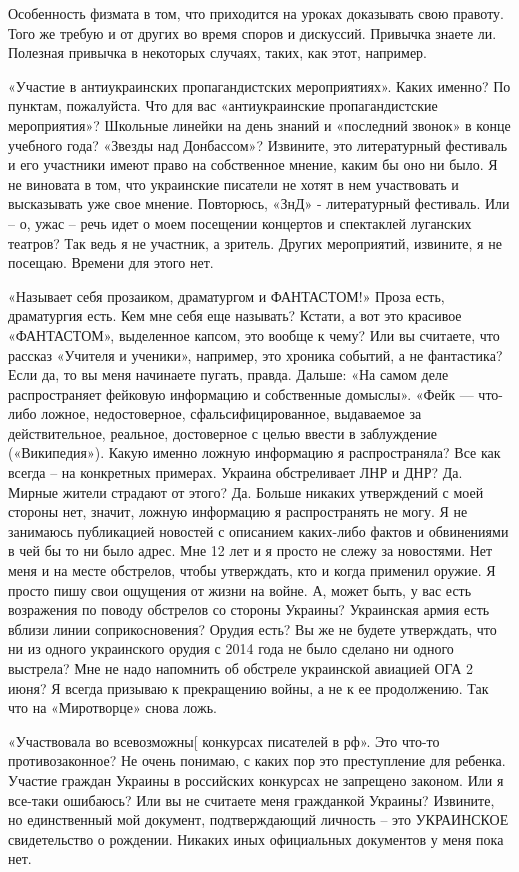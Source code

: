 Особенность физмата в том, что приходится на уроках доказывать свою правоту.
Того же требую и от других во время споров и дискуссий. Привычка знаете ли.
Полезная привычка в некоторых случаях, таких, как этот, например.

«Участие в антиукраинских пропагандистских мероприятиях». Каких именно? По
пунктам, пожалуйста. Что для вас «антиукраинские пропагандистские мероприятия»?
Школьные линейки на день знаний и «последний звонок» в конце учебного года?
«Звезды над Донбассом»? Извините, это литературный фестиваль и его участники
имеют право на собственное мнение, каким бы оно ни было. Я не виновата в том,
что украинские писатели не хотят в нем участвовать и высказывать уже свое
мнение. Повторюсь, «ЗнД» - литературный фестиваль. Или – о, ужас – речь идет о
моем посещении концертов и спектаклей луганских театров? Так ведь я не
участник, а зритель. Других мероприятий, извините, я не посещаю. Времени для
этого нет.

«Называет себя прозаиком, драматургом и ФАНТАСТОМ!» Проза есть, драматургия
есть. Кем мне себя еще называть? Кстати, а вот это красивое «ФАНТАСТОМ»,
выделенное капсом, это вообще к чему? Или вы считаете, что рассказ «Учителя и
ученики», например, это хроника событий, а не фантастика? Если да, то вы меня
начинаете пугать, правда. Дальше: «На самом деле распространяет фейковую
информацию и собственные домыслы». «Фейк — что-либо ложное, недостоверное,
сфальсифицированное, выдаваемое за действительное, реальное, достоверное с
целью ввести в заблуждение («Википедия»). Какую именно ложную информацию я
распространяла? Все как всегда – на конкретных примерах. Украина обстреливает
ЛНР и ДНР? Да. Мирные жители страдают от этого? Да. Больше никаких утверждений
с моей стороны нет, значит, ложную информацию я распространять не могу. Я не
занимаюсь публикацией новостей с описанием каких-либо фактов и обвинениями в
чей бы то ни было адрес. Мне 12 лет и я просто не слежу за новостями. Нет меня
и на месте обстрелов, чтобы утверждать, кто и когда применил оружие. Я просто
пишу свои ощущения от жизни на войне. А, может быть, у вас есть возражения по
поводу обстрелов со стороны Украины? Украинская армия есть вблизи линии
соприкосновения? Орудия есть? Вы же не будете утверждать, что ни из одного
украинского орудия с 2014 года не было сделано ни одного выстрела? Мне не надо
напомнить об обстреле украинской авиацией ОГА 2 июня? Я всегда призываю к
прекращению войны, а не к ее продолжению. Так что на «Миротворце» снова ложь.

«Участвовала во всевозможны[ конкурсах писателей в рф». Это что-то
противозаконное? Не очень понимаю, с каких пор это преступление для ребенка.
Участие граждан Украины в российских конкурсах не запрещено законом. Или я
все-таки ошибаюсь? Или вы не считаете меня гражданкой Украины? Извините, но
единственный мой документ, подтверждающий личность – это УКРАИНСКОЕ
свидетельство о рождении. Никаких иных официальных документов у меня пока нет.

